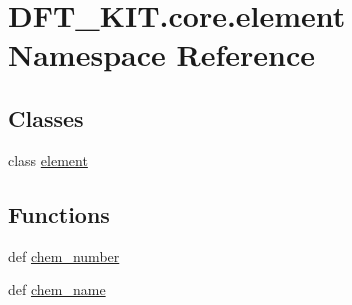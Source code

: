 \hypertarget{namespace_d_f_t___k_i_t_1_1core_1_1element}{\section{D\+F\+T\+\_\+\+K\+I\+T.\+core.\+element Namespace Reference}
\label{namespace_d_f_t___k_i_t_1_1core_1_1element}
}
\subsection*{Classes}
\begin{DoxyCompactItemize}
\item 
class \hyperlink{class_d_f_t___k_i_t_1_1core_1_1element_1_1element}{element}
\end{DoxyCompactItemize}
\subsection*{Functions}
\begin{DoxyCompactItemize}
\item 
def \hyperlink{namespace_d_f_t___k_i_t_1_1core_1_1element_a688120b4538e366222f5299c61e924e4}{chem\+\_\+number}
\item 
def \hyperlink{namespace_d_f_t___k_i_t_1_1core_1_1element_accc4487239f4ac6a7ac203e34e94a6c5}{chem\+\_\+name}
\end{DoxyCompactItemize}
